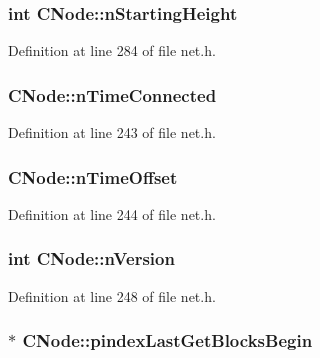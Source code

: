 \subsubsection[{n\+Starting\+Height}]{\setlength{\rightskip}{0pt plus 5cm}int C\+Node\+::n\+Starting\+Height}\label{class_c_node_a597b41bd64e2ac9391b7211e65aeb52a}


Definition at line 284 of file net.\+h.

\hypertarget{class_c_node_abb39393ef08cb5668ded6cb14cdbc147}{}
\subsubsection[{n\+Time\+Connected}]{ C\+Node\+::n\+Time\+Connected}\label{class_c_node_abb39393ef08cb5668ded6cb14cdbc147}


Definition at line 243 of file net.\+h.

\hypertarget{class_c_node_a3079fadef397abbf7e8d444f4426ebe7}{}
\subsubsection[{n\+Time\+Offset}]{ C\+Node\+::n\+Time\+Offset}\label{class_c_node_a3079fadef397abbf7e8d444f4426ebe7}


Definition at line 244 of file net.\+h.

\hypertarget{class_c_node_a99173eb3cef17e699ba21a5249ac33d2}{}
\subsubsection[{n\+Version}]{\setlength{\rightskip}{0pt plus 5cm}int C\+Node\+::n\+Version}\label{class_c_node_a99173eb3cef17e699ba21a5249ac33d2}


Definition at line 248 of file net.\+h.

\hypertarget{class_c_node_ac655c80f7fbef266417985776043785b}{}
\subsubsection[{pindex\+Last\+Get\+Blocks\+Begin}]{$\ast$ C\+Node\+::pindex\+Last\+Get\+Blocks\+Begin}\label{class_c_node_ac655c80f7fbef266417985776043785b}


